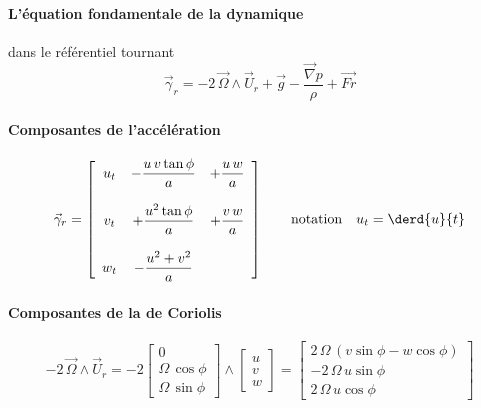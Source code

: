 \paragraph{L'équation fondamentale de la dynamique} dans le référentiel tournant
\[
\vec{\gamma}_r = -2 \, \vec{\Omega} \wedge \vec{U}_r + \vec{g} - \dfrac{\vec{\nabla}p}{\rho} + \vec{Fr}
\]

\paragraph{Composantes de l'acc\'el\'eration}
\[
\vec{\gamma}_r=\left[\begin{array}{ccc} u_t & - \dfrac{u\,v\tan\phi}{a} & + \dfrac{u\,w}{a}\\ & & \\ v_t & + \dfrac{u^2\tan\phi}{a} & + \dfrac{v\,w}{a}\\ & & \\ w_t & - \dfrac{u^2+v^2}{a} & \\ \end{array}\right] \qquad \text{notation} \quad u_t = \derd{u}{t}
\]

\paragraph{Composantes de la  de Coriolis}
\[
-2\,\vec{\Omega}\wedge\vec{U}_r=-2 \left[ \begin{array}{c} 0\\ \Omega\,\cos\phi\\ \Omega\,\sin\phi \end{array} \right] \wedge \left[ \begin{array}{c} u\\ v\\ w \end{array} \right] = \left[ \begin{array}{c} 2 \, \Omega \, ( v\sin\phi-w\cos\phi )\\ -2 \, \Omega \, u\sin\phi\\ 2 \, \Omega \, u\cos\phi \end{array} \right]
\]
